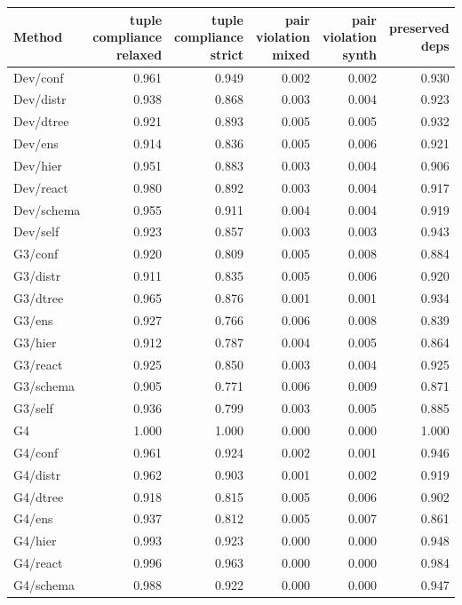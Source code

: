 \begin{table}[t]
\centering
\scriptsize
\setlength\tabcolsep{3pt}
\begin{tabular}{lrrrrr}
\toprule
\textbf{Method} & \textbf{tuple compliance relaxed} & \textbf{tuple compliance strict} & \textbf{pair violation mixed} & \textbf{pair violation synth} & \textbf{preserved deps} \\
\midrule
Dev/conf & 0.961 & 0.949 & 0.002 & 0.002 & 0.930 \\
Dev/distr & 0.938 & 0.868 & 0.003 & 0.004 & 0.923 \\
Dev/dtree & 0.921 & 0.893 & 0.005 & 0.005 & 0.932 \\
Dev/ens & 0.914 & 0.836 & 0.005 & 0.006 & 0.921 \\
Dev/hier & 0.951 & 0.883 & 0.003 & 0.004 & 0.906 \\
Dev/react & 0.980 & 0.892 & 0.003 & 0.004 & 0.917 \\
Dev/schema & 0.955 & 0.911 & 0.004 & 0.004 & 0.919 \\
Dev/self & 0.923 & 0.857 & 0.003 & 0.003 & 0.943 \\
G3/conf & 0.920 & 0.809 & 0.005 & 0.008 & 0.884 \\
G3/distr & 0.911 & 0.835 & 0.005 & 0.006 & 0.920 \\
G3/dtree & 0.965 & 0.876 & 0.001 & 0.001 & 0.934 \\
G3/ens & 0.927 & 0.766 & 0.006 & 0.008 & 0.839 \\
G3/hier & 0.912 & 0.787 & 0.004 & 0.005 & 0.864 \\
G3/react & 0.925 & 0.850 & 0.003 & 0.004 & 0.925 \\
G3/schema & 0.905 & 0.771 & 0.006 & 0.009 & 0.871 \\
G3/self & 0.936 & 0.799 & 0.003 & 0.005 & 0.885 \\
G4 & 1.000 & 1.000 & 0.000 & 0.000 & 1.000 \\
G4/conf & 0.961 & 0.924 & 0.002 & 0.001 & 0.946 \\
G4/distr & 0.962 & 0.903 & 0.001 & 0.002 & 0.919 \\
G4/dtree & 0.918 & 0.815 & 0.005 & 0.006 & 0.902 \\
G4/ens & 0.937 & 0.812 & 0.005 & 0.007 & 0.861 \\
G4/hier & 0.993 & 0.923 & 0.000 & 0.000 & 0.948 \\
G4/react & 0.996 & 0.963 & 0.000 & 0.000 & 0.984 \\
G4/schema & 0.988 & 0.922 & 0.000 & 0.000 & 0.947 \\

\end{tabular}
\end{table}
